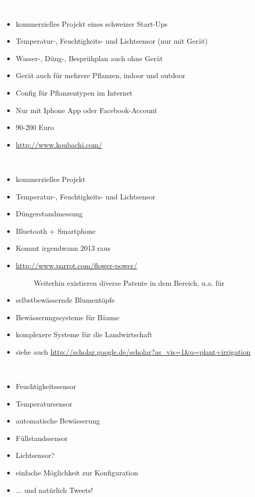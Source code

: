 \documentclass[bigger]{beamer}
\newcommand{\topic}[1]{{\huge{\textcolor{white}{\textbf{#1}}}}}
\begin{document}
\begin{frame}{\topic{Koubachi}}
	\begin{itemize}
      \item kommerzielles Projekt eines schweizer Start-Ups
		\item Temperatur-, Feuchtigkeits- und Lichtsensor (nur mit Gerät)
		\item Wasser-, Düng-, Besprühplan auch ohne Gerät
		\item Gerät auch für mehrere Pflanzen, indoor und outdoor
		\item Config für Pflanzentypen im Internet
		\item Nur mit Iphone App oder Facebook-Account
		\item 90-200 Euro
		\item \url{http://www.koubachi.com/}
	\end{itemize}
\end{frame}

\begin{frame}{\topic{Parrot Flower Power}}
	\begin{itemize}
      \item kommerzielles Projekt
		\item Temperatur-, Feuchtigkeits- und Lichtsensor
		\item Düngerstandmessung
		\item Bluetooth + Smartphone
		\item Kommt irgendwann 2013 raus
		\item\url{http://www.parrot.com/flower-power/}
	\end{itemize}
\end{frame}

\begin{frame}{\topic{Patente}}
   Weiterhin existieren diverse Patente in dem Bereich, u.a. für
	\begin{itemize}
		\item selbstbewässernde Blumentöpfe
		\item Bewässerungssysteme für Bäume
      \item komplexere Systeme für die Landwirtschaft
      \item siehe auch \url{http://scholar.google.de/scholar?as_vis=1&q=plant+irrigation}
	\end{itemize}
\end{frame}

\begin{frame}{\topic{The "planned" guard}}
	\begin{itemize}
		\item Feuchtigkeitssensor
		\item Temperatursensor
		\item automatische Bewässerung
		\item Füllstandssensor
		\item Lichtsensor?
		\item einfache Möglichkeit zur Konfiguration
		\item ... und natürlich Tweets!
	\end{itemize}
\end{frame}
\end{document}
